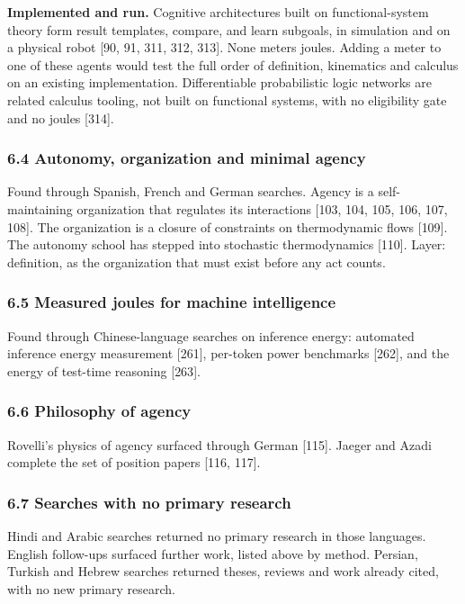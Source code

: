 \documentclass[
  10pt,
]{article}
\begin{document}
\textbf{Implemented and run.} Cognitive architectures built on
functional-system theory form result templates, compare, and learn
subgoals, in simulation and on a physical robot {[}90, 91, 311, 312,
313{]}. None meters joules. Adding a meter to one of these agents would
test the full order of definition, kinematics and calculus on an
existing implementation. Differentiable probabilistic logic networks are
related calculus tooling, not built on functional systems, with no
eligibility gate and no joules {[}314{]}.

\subsubsection{6.4 Autonomy, organization and minimal
agency}\label{autonomy-organization-and-minimal-agency}

Found through Spanish, French and German searches. Agency is a
self-maintaining organization that regulates its interactions {[}103,
104, 105, 106, 107, 108{]}. The organization is a closure of constraints
on thermodynamic flows {[}109{]}. The autonomy school has stepped into
stochastic thermodynamics {[}110{]}. Layer: definition, as the
organization that must exist before any act counts.

\subsubsection{6.5 Measured joules for machine
intelligence}\label{measured-joules-for-machine-intelligence}

Found through Chinese-language searches on inference energy: automated
inference energy measurement {[}261{]}, per-token power benchmarks
{[}262{]}, and the energy of test-time reasoning {[}263{]}.

\subsubsection{6.6 Philosophy of agency}\label{philosophy-of-agency}

Rovelli's physics of agency surfaced through German {[}115{]}. Jaeger
and Azadi complete the set of position papers {[}116, 117{]}.

\subsubsection{6.7 Searches with no primary
research}\label{searches-with-no-primary-research}

Hindi and Arabic searches returned no primary research in those
languages. English follow-ups surfaced further work, listed above by
method. Persian, Turkish and Hebrew searches returned theses, reviews
and work already cited, with no new primary research.
\end{document}
